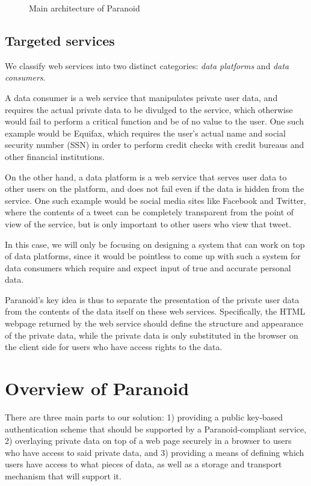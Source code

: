 \documentclass[letterpaper,twocolumn,10pt]{article}
\begin{document}
\begin{figure}
    \centering
    \def\svgwidth{1.5\columnwidth}
    
    \caption{Main architecture of Paranoid}
    \label{fig:paranoid_architecture}
\end{figure}

\subsection{Targeted services}

We classify web services into two distinct categories: \textit{data platforms} and \textit{data consumers}.

A data consumer is a web service that manipulates private user data, and requires the actual private data to be divulged to the service, which otherwise would fail to perform a critical function and be of no value to the user. One such example would be Equifax, which requires the user's actual name and social security number (SSN) in order to perform credit checks with credit bureaus and other financial institutions.

On the other hand, a data platform is a web service that serves user data to other users on the platform, and does not fail even if the data is hidden from the service. One such example would be social media sites like Facebook and Twitter, where the contents of a tweet can be completely transparent from the point of view of the service, but is only important to other users who view that tweet.

In this case, we will only be focusing on designing a system that can work on top of data platforms, since it would be pointless to come up with such a system for data consumers which require and expect input of true and accurate personal data.

Paranoid's key idea is thus to separate the presentation of the private user data from the contents of the data itself on these web services. Specifically, the HTML webpage returned by the web service should define the structure and appearance of the private data, while the private data is only substituted in the browser on the client side for users who have access rights to the data.

\section{Overview of Paranoid}

There are three main parts to our solution: 1) providing a public key-based authentication scheme that should be supported by a Paranoid-compliant service, 2) overlaying private data on top of a web page securely in a browser to users who have access to said private data, and 3) providing a means of defining which users have access to what pieces of data, as well as a storage and transport mechanism that will support it.
\end{document}

